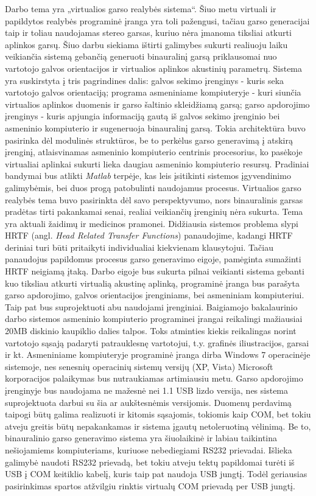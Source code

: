 \documentclass[]{vgtuef}
\begin{document}
Darbo tema yra „virtualios garso realybės sistema“. Šiuo metu virtuali ir papildytos realybės programinė įranga yra toli pažengusi, tačiau garso generacijai taip ir toliau naudojamas stereo garsas, kuriuo nėra įmanoma tiksliai atkurti aplinkos garsų.
Šiuo darbu siekiama ištirti galimybes sukurti realiuoju laiku veikiančia sistemą gebančią generuoti binauralinį garsą priklausomai nuo vartotojo galvos orientacijos ir virtualios aplinkos akustinių parametrų. Sistema yra suskirstyta į tris pagrindines dalis: galvos sekimo įrenginys - kuris seka vartotojo galvos orientaciją; programa asmeniniame kompiuteryje - kuri siunčia virtualios aplinkos duomenis ir garso šaltinio skleidžiamą garsą; garso apdorojimo įrenginys - kuris apjungia informaciją gautą iš galvos sekimo įrenginio bei asmeninio kompiuterio ir sugeneruoja binauralinį garsą. Tokia architektūra buvo pasirinka dėl modulinės struktūros, be to perkėlus garso generavimą į atskirą įrenginį, atlaisvinamas asmeninio kompiuterio centrinis procesorius, ko pasėkoje virtualiai aplinkai sukurti lieka daugiau asmeninio kompiuterio resursų.
Pradiniai bandymai bus atlikti \textit{Matlab} terpėje, kas leis įsitikinti sistemos įgyvendinimo galimybėmis, bei duos progą patobulinti naudojamus procesus.
Virtualios garso realybės tema buvo pasirinkta dėl savo perspektyvumo, nors binauralinis garsas pradėtas tirti pakankamai senai, realiai veikiančių įrenginių nėra sukurta. Tema yra aktuali žaidimų ir medicinos pramonei.
Didžiausia sistemos problema slypi HRTF (angl. \textit{Head Related Transfer Functions}) panaudojime, kadangi HRTF deriniai turi būti pritaikyti individualiai kiekvienam klausytojui. Tačiau panaudojus papildomus procesus garso generavimo eigoje, pamėginta sumažinti HRTF neigiamą įtaką.
Darbo eigoje bus sukurta pilnai veikianti sistema gebanti kuo tiksliau atkurti virtualią akustinę aplinką, programinė įranga bus parašyta garso apdorojimo, galvos orientacijos įrenginiams, bei asmeniniam kompiuteriui. Taip pat bus suprojektuoti abu naudojami įrenginiai.
Baigiamojo bakalaurinio darbo sistemos asmeninio kompiuterio programinei įrangai reikalingi mažiausiai 20MB diskinio kaupiklio dalies talpos. Toks atminties kiekis reikalingas norint vartotojo sąsają padaryti patrauklesnę vartotojui, t.y. grafinės iliustracijos, garsai ir kt. Asmeniniame kompiuteryje programinė įranga dirba Windows 7 operacinėje sistemoje, nes senesnių operacinių sistemų versijų (XP, Vista) Microsoft korporacijos palaikymas bus nutraukiamas artimiausiu metu.
Garso apdorojimo įrenginyje bus naudojama ne mažesnė nei 1.1 USB lizdo versija, nes sistema suprojektuota darbui su šia ar aukštesnėmis versijomis. Duomenų perdavimą taipogi būtų galima realizuoti ir kitomis sąsajomis, tokiomis kaip COM, bet tokiu atveju greitis būtų nepakankamas ir sistema įgautų netoleruotiną vėlinimą. Be to, binauralinio garso generavimo sistema yra šiuolaikinė ir labiau taikintina nešiojamiems kompiuteriams, kuriuose nebediegiami RS232 prievadai. Išlieka galimybė naudoti RS232 prievadą, bet tokiu atveju tektų papildomai turėti iš USB į COM keitiklio kabelį, kuris taip pat naudoja USB jungtį. Todėl geriausias pasirinkimas spartos atžvilgiu rinktis virtualų COM  prievadą per USB jungtį.
\end{document}
